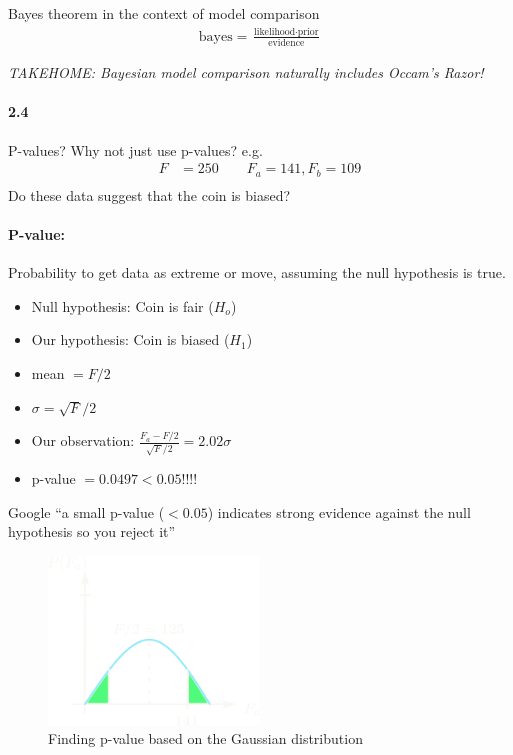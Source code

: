 \documentclass[../main.tex]{subfiles}
\begin{document}
Bayes theorem in the context of model comparison
\begin{align*}
    \textrm{bayes} = \frac{\textrm{likelihood} \cdot \textrm{prior}}{\textrm{evidence}}
\end{align*}

\emph{TAKEHOME: Bayesian model comparison naturally includes Occam's Razor!}

\paragraph{2.4} P-values? Why not just use p-values? e.g.
\begin{align*}
    F &= 250 \qquad F_a = 141, F_b = 109 \\
\end{align*}
Do these data suggest that the coin is biased? 

\paragraph{P-value:} Probability to get data as extreme or move, assuming the null hypothesis is
true. 
\begin{itemize}
    \item Null hypothesis: Coin is fair ($H_o$)
    \item Our hypothesis: Coin is biased ($H_1$)
    \item mean $= F/2$
    \item $\sigma = \sqrt{F}/2$
    \item Our observation: $\frac{F_a - F/2}{\sqrt{F}/2} = 2.02 \sigma$
    \item p-value $= 0.0497 < 0.05$!!!!
\end{itemize}
Google ``a small p-value ($<0.05$) indicates strong evidence against the null hypothesis so you
reject it''
\begin{figure}[ht]
    \centering
    \includegraphics[width=0.5\textwidth]{pvalue.png}
    \caption{Finding p-value based on the Gaussian distribution}
    \label{fig:pvalue}
\end{figure}
\end{document}
